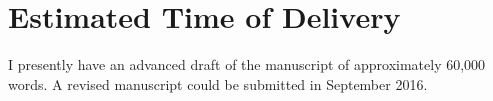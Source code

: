 \documentclass[12pt]{article}
\begin{document}

\section{Estimated Time of Delivery} %
\label{sec:estimated_time_of_delivery}

I presently have an advanced draft of the manuscript of approximately 60,000 words. A revised manuscript could be submitted in September 2016.




\end{document}

